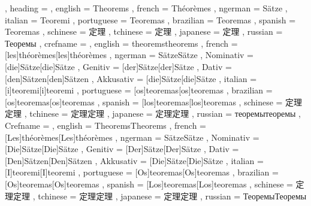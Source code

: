   {
    , heading =   {
                    , english     = Theorems
                    , french      = Théorèmes
                    , ngerman     = Sätze
                    , italian     = Teoremi
                    , portuguese  = Teoremas
                    , brazilian   = Teoremas
                    , spanish     = Teoremas
                    , schinese    = 定理
                    , tchinese    = 定理
                    , japanese    = 定理
                    , russian     = Теоремы
                  }
    , crefname =  {
                    , english     = {theorems}{theorems}
                    , french      = [les]{théorèmes}[les]{théorèmes}
                    , ngerman     = { {Sätze}{Sätze}
                                      , Nominativ = [die]{Sätze}[die]{Sätze}
                                      , Genitiv   = [der]{Sätze}[der]{Sätze}
                                      , Dativ     = [den]{Sätzen}[den]{Sätzen}
                                      , Akkusativ = [die]{Sätze}[die]{Sätze}
                                    }
                    , italian     = [i]{teoremi}[i]{teoremi}
                    , portuguese  = [os]{teoremas}[os]{teoremas}
                    , brazilian   = [os]{teoremas}[os]{teoremas}
                    , spanish     = [los]{teoremas}[los]{teoremas}
                    , schinese    = {定理}{定理}
                    , tchinese    = {定理}{定理}
                    , japanese    = {定理}{定理}
                    , russian     = {теоремы}{теоремы}
                  }
    , Crefname =  {
                    , english     = {Theorems}{Theorems}
                    , french      = [Les]{théorèmes}[Les]{théorèmes}
                    , ngerman     = { {Sätze}{Sätze}
                                      , Nominativ = [Die]{Sätze}[Die]{Sätze}
                                      , Genitiv   = [Der]{Sätze}[Der]{Sätze}
                                      , Dativ     = [Den]{Sätzen}[Den]{Sätzen}
                                      , Akkusativ = [Die]{Sätze}[Die]{Sätze}
                                    }
                    , italian     = [I]{teoremi}[I]{teoremi}
                    , portuguese  = [Os]{teoremas}[Os]{teoremas}
                    , brazilian   = [Os]{teoremas}[Os]{teoremas}
                    , spanish     = [Los]{teoremas}[Los]{teoremas}
                    , schinese    = {定理}{定理}
                    , tchinese    = {定理}{定理}
                    , japanese    = {定理}{定理}
                    , russian     = {Теоремы}{Теоремы}
                  }
  }
